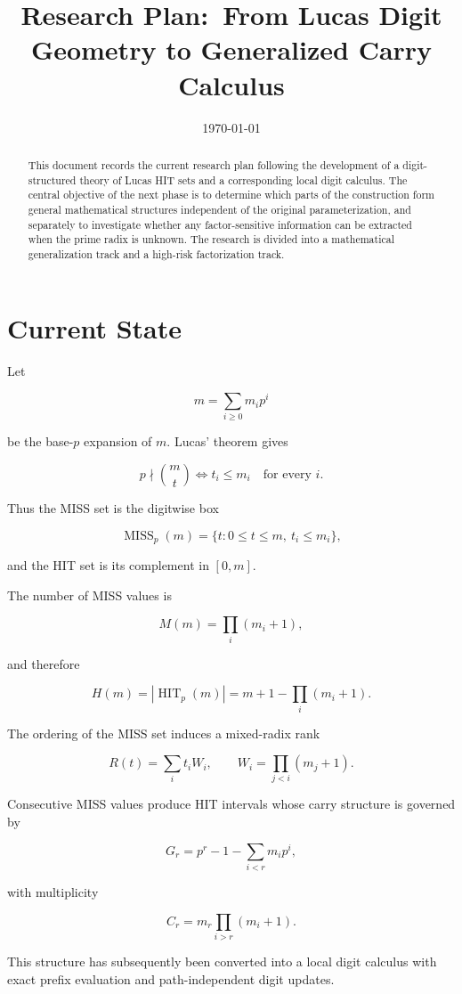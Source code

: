 \documentclass[11pt]{article}
\title{Research Plan:\
From Lucas Digit Geometry to Generalized Carry Calculus}
\author{}
\date{\today}
\begin{document}
\maketitle

\begin{abstract}
This document records the current research plan following the development of a digit-structured theory of Lucas HIT sets and a corresponding local digit calculus. The central objective of the next phase is to determine which parts of the construction form general mathematical structures independent of the original parameterization, and separately to investigate whether any factor-sensitive information can be extracted when the prime radix is unknown. The research is divided into a mathematical generalization track and a high-risk factorization track.
\end{abstract}

\section{Current State}

Let

$$
m=\sum_{i\geq 0}m_i p^i
$$

be the base-$p$ expansion of $m$. Lucas' theorem gives

$$
p\nmid \binom{m}{t}
\iff
t_i\leq m_i\quad\text{for every }i.
$$

Thus the MISS set is the digitwise box

$$
\operatorname{MISS}_p(m)
=
\{t:0\leq t\leq m,\ t_i\leq m_i\},
$$

and the HIT set is its complement in $[0,m]$.

The number of MISS values is

$$
M(m)=\prod_i(m_i+1),
$$

and therefore

$$
H(m)
=
|\operatorname{HIT}_p(m)|
=
m+1-\prod_i(m_i+1).
$$

The ordering of the MISS set induces a mixed-radix rank

$$
R(t)=\sum_i t_iW_i,
\qquad
W_i=\prod_{j<i}(m_j+1).
$$

Consecutive MISS values produce HIT intervals whose carry structure is governed by

$$
G_r
=
p^r-1-\sum_{i<r}m_ip^i,
$$

with multiplicity

$$
C_r
=
m_r\prod_{i>r}(m_i+1).
$$

This structure has subsequently been converted into a local digit calculus with exact prefix evaluation and path-independent digit updates.
\end{document}
